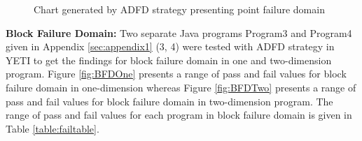 \begin{figure} [H]
\centering
{}

\bigskip
{}
\bigskip
\caption{Chart generated by ADFD strategy presenting point failure domain}
\end{figure}
\bigskip


\newpage
\noindent \textbf{Block Failure Domain:}  Two separate Java programs Program3 and Program4 given in Appendix \ref{sec:appendix1} (3, 4) were tested with ADFD strategy in YETI to get the findings for block failure domain in one and two-dimension program. Figure \ref{fig:BFDOne} presents a range of pass and fail values for block failure domain in one-dimension whereas Figure \ref{fig:BFDTwo} presents a range of pass and fail values for block failure domain in two-dimension program. The range of pass and fail values for each program in block failure domain is given in Table \ref{table:failtable}.





